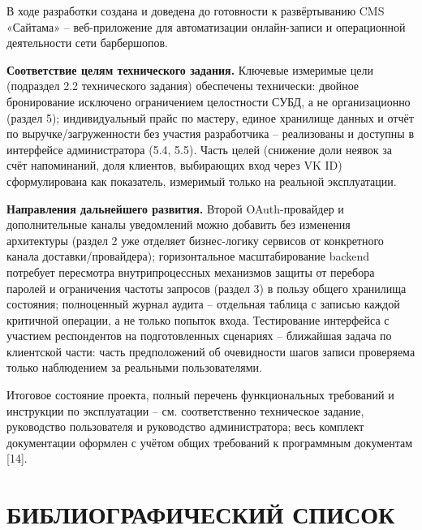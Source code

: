 В ходе разработки создана и доведена до готовности к развёртыванию CMS
«Сайтама» -- веб-приложение для автоматизации онлайн-записи и
операционной деятельности сети барбершопов.

\textbf{Соответствие целям технического задания.} Ключевые измеримые цели
(подраздел 2.2 технического задания) обеспечены технически: двойное
бронирование исключено ограничением целостности СУБД, а не
организационно (раздел 5); индивидуальный прайс по мастеру, единое
хранилище данных и отчёт по выручке/загруженности без участия
разработчика -- реализованы и доступны в интерфейсе администратора
(5.4, 5.5). Часть целей (снижение доли неявок за счёт напоминаний, доля
клиентов, выбирающих вход через VK ID) сформулирована как показатель,
измеримый только на реальной эксплуатации.

\textbf{Направления дальнейшего развития.} Второй OAuth-провайдер и
дополнительные каналы уведомлений можно добавить без изменения
архитектуры (раздел 2 уже отделяет бизнес-логику сервисов от конкретного
канала доставки/провайдера); горизонтальное масштабирование backend
потребует пересмотра внутрипроцессных механизмов защиты от перебора
паролей и ограничения частоты запросов (раздел 3) в пользу общего
хранилища состояния; полноценный журнал аудита -- отдельная таблица с
записью каждой критичной операции, а не только попыток входа.
Тестирование интерфейса с участием респондентов на подготовленных
сценариях -- ближайшая задача по клиентской части: часть предположений об
очевидности шагов записи проверяема только наблюдением за реальными
пользователями.

Итоговое состояние проекта, полный перечень функциональных требований и
инструкции по эксплуатации -- см. соответственно техническое задание,
руководство пользователя и руководство администратора; весь комплект
документации оформлен с учётом общих требований к программным документам
[14].

\section*{\hspace*{\gostindent}БИБЛИОГРАФИЧЕСКИЙ СПИСОК}

